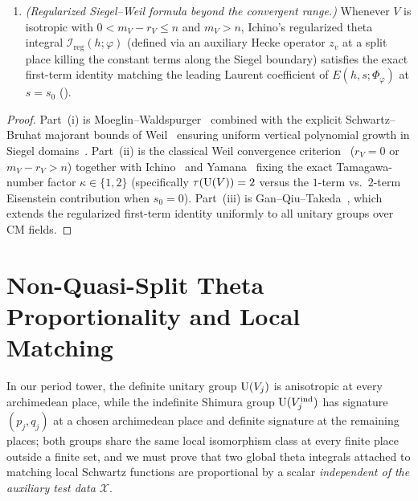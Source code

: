 \begin{proposition}
\begin{enumerate}[label=\textup{(\roman*)}]
\item \emph{(Regularized Siegel--Weil formula beyond the convergent range.)} Whenever $V$ is isotropic with $0 < m_V - r_V \le n$ and $m_V > n$, Ichino's regularized theta integral $\mathcal{I}_{\mathrm{reg}}(h; \varphi)$ (defined via an auxiliary Hecke operator $z_v$ at a split place killing the constant terms along the Siegel boundary) satisfies the exact first-term identity matching the leading Laurent coefficient of $E(h, s; \Phi_\varphi)$ at $s = s_0$ ().
\end{enumerate}
\end{proposition}

\begin{proof}
Part~(i) is Moeglin--Waldspurger~\cite[Chapter~IV]{MoeglinWaldspurger1995} combined with the explicit Schwartz--Bruhat majorant bounds of Weil~\cite{Weil1965} ensuring uniform vertical polynomial growth in Siegel domains~\cite{Borel1969}. Part~(ii) is the classical Weil convergence criterion~\cite{Weil1965} ($r_V = 0$ or $m_V - r_V > n$) together with Ichino~\cite[Theorem~1.1]{Ichino2004,Ichino2007} and Yamana~\cite[Theorem~1.1]{Yamana2013} fixing the exact Tamagawa-number factor $\kappa \in \{1, 2\}$ (specifically $\tau(\mathrm{U}(V)) = 2$ versus the $1$-term vs.\ $2$-term Eisenstein contribution when $s_0 = 0$). Part~(iii) is Gan--Qiu--Takeda~\cite[Theorem~1.1]{GanQiuTakeda2014}, which extends the regularized first-term identity uniformly to all unitary groups over CM fields.
\end{proof}

\section{Non-Quasi-Split Theta Proportionality and Local Matching}
\label{sec:11:theta-agree}

In our period tower, the definite unitary group $\mathrm{U}(V_j)$ is anisotropic at every archimedean place, while the indefinite Shimura group $\mathrm{U}(V_j^{\mathrm{ind}})$ has signature $(p_j, q_j)$ at a chosen archimedean place and definite signature at the remaining places; both groups share the same local isomorphism class at every finite place outside a finite set, and we must prove that two global theta integrals attached to matching local Schwartz functions are proportional by a scalar \emph{independent of the auxiliary test data $\mathcal{X}$}.


